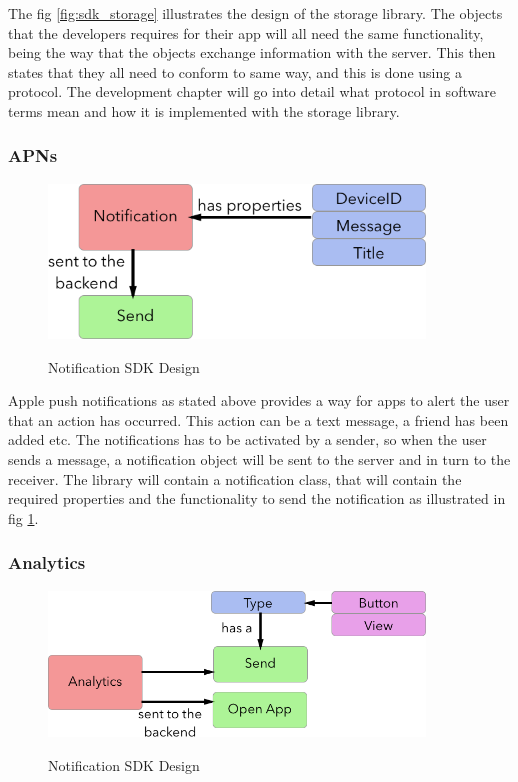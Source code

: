 The fig \ref{fig:sdk_storage} illustrates the design of the storage library. The objects that the developers requires for their app will all need the same functionality, being the way that the objects exchange information with the server. This then states that they all need to conform to same way, and this is done using a protocol. The development chapter will go into detail what protocol in software terms mean and how it is implemented with the storage library.  

\subsubsection{APNs}

\begin{figure}[!h]
    \caption{Notification SDK Design}
    \centering
    \includegraphics[width=100mm]{images/design/notification}
    \label{fig:apns_storage}
\end{figure}

Apple push notifications as stated above provides a way for apps to alert the user that an action has occurred. This action can be a text message, a friend has been added etc. The notifications has to be activated by a sender, so when the user sends a message, a notification object will be sent to the server and in turn to the receiver. The library will contain a notification class, that will contain the required properties and the functionality to send the notification as illustrated in fig \ref{fig:apns_storage}.

\subsubsection{Analytics}

\begin{figure}[!h]
    \caption{Notification SDK Design}
    \centering
    \includegraphics[width=100mm]{images/design/analytics}
    \label{fig:analytics_design}
\end{figure}

